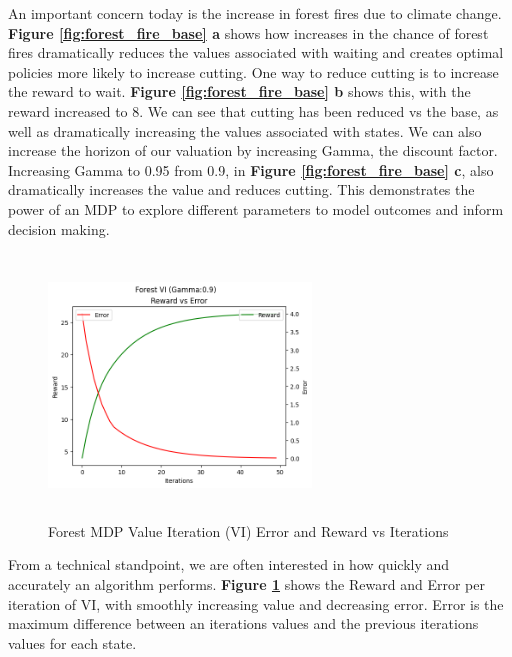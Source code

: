 \documentclass[letterpaper]{article} %
\begin{document}
An important concern today is the increase in forest fires due to climate change.  \textbf{Figure \ref{fig:forest_fire_base} a} shows how increases in the chance of forest fires dramatically reduces the values associated with waiting and creates optimal policies more likely to increase cutting.  One way to reduce cutting is to increase the reward to wait.   \textbf{Figure \ref{fig:forest_fire_base} b} shows this, with the reward increased to 8.  We can see that cutting has been reduced vs the base, as well as dramatically increasing the values associated with states.  We can also increase the horizon of our valuation by increasing Gamma, the discount factor.  Increasing Gamma to 0.95 from 0.9, in \textbf{Figure \ref{fig:forest_fire_base} c}, also dramatically increases the value and reduces cutting.  This demonstrates the power of an MDP to explore different parameters to model outcomes and inform decision making.


\begin{figure}[!htb]
\centering
\includegraphics[width=2.75in, height=2.75in]{Figures/Forest_VI_Gamma_0_9_Reward_vs_Error.png}
\caption{Forest MDP Value Iteration (VI) Error and Reward vs Iterations}
\label{fig:forest_vi_reward_error}
\end{figure}
From a technical standpoint, we are often interested in how quickly and accurately an algorithm performs. \textbf{Figure \ref{fig:forest_vi_reward_error}} shows the Reward and Error per iteration of VI, with smoothly increasing value and decreasing error.  Error is the maximum difference between an iterations values and the previous iterations values for each state.
\end{document}
